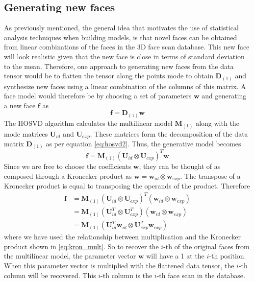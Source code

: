 \documentclass[11pt,a4paper]{report}
\begin{document}
\subsection{Generating new faces}
As previously mentioned, the general idea that motivates the use of statistical
analysis techniques when building models, is that
novel faces can be obtained from linear combinations of the faces in the 3D
face scan database. This new face will look realistic given that the new face is close in terms of standard
deviation to the mean. Therefore, one approach to generating new faces from the
data tensor would be to flatten the tensor along the points mode to obtain
$\mathbf{D}_{(1)}$ and synthesize new faces using a linear combination of the
columns of this matrix. A face model would therefore be by choosing a set of
parameters $\mathbf{w}$ and generating a new face $\mathbf{f}$ as 
\begin{equation}\label{eq:gen}
\mathbf{f} = \mathbf{D}_{(1)}\mathbf{w}
\end{equation}
The HOSVD algorithm calculates the multilinear model $\mathbf{M}_{(1)}$ along with the mode
matrices $\mathbf{U}_{id}$ and $\mathbf{U}_{exp}$. These matrices form the
decomposition of the data matrix $\mathbf{D}_{(1)}$ as per equation
\ref{eq:hosvd2}. Thus, the generative model becomes
\begin{equation}\label{eq:gen0.1}
\mathbf{f} = \mathbf{M}_{(1)}(\mathbf{U}_{id} \otimes \mathbf{U}_{exp})^T\mathbf{w}
\end{equation}
Since we are free to choose the coefficients $\mathbf{w}$, they can be
thought of as composed through a Kronecker product as $\mathbf{w} =
\mathbf{w}_{id} \otimes \mathbf{w}_{exp}$. The transpose of a Kronecker product
is equal to transposing the operands of the product. Therefore
\begin{align}\label{eq:gen1}
\mathbf{f} &= \mathbf{M}_{(1)}(\mathbf{U}_{id} \otimes
\mathbf{U}_{exp})^T(\mathbf{w}_{id} \otimes \mathbf{w}_{exp})\\
&=\mathbf{M}_{(1)}(\mathbf{U}_{id}^T \otimes
\mathbf{U}_{exp}^T)(\mathbf{w}_{id} \otimes \mathbf{w}_{exp})\\
\label{eq:gen2}
&= \mathbf{M}_{(1)}(\mathbf{U}_{id}^T\mathbf{w}_{id} \otimes
\mathbf{U}_{exp}^T\mathbf{w}_{exp})
\end{align}
where we have used the relationship between multiplication and the Kronecker
product shown in \ref{eq:kron_mult}. So to recover the $i$-th of the original faces
from the multilinear model, the parameter vector $\mathbf{w}$ will have a 1 at
the $i$-th position. When this parameter vector is multiplied with the flattened
data tensor, the $i$-th column will be recovered. This $i$-th column is the
$i$-th face scan in the database. 
\end{document}

